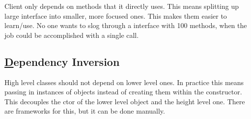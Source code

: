 \documentclass{article}
\begin{document}
Client only depends on methods that it directly uses. This means splitting up large interface into smaller,
more focused ones. This makes them easier to learn/use. No one wants to slog through a interface with 100
methods, when the job could be accomplished with a single call.

\subsection{\underline{D}ependency Inversion}

High level classes should not depend on lower level ones. In practice this means passing in
instances of objects instead of creating them within the constructor. This decouples the ctor
of the lower level object and the height level one. There are frameworks for this, but it can
be done manually.




\end{document}
